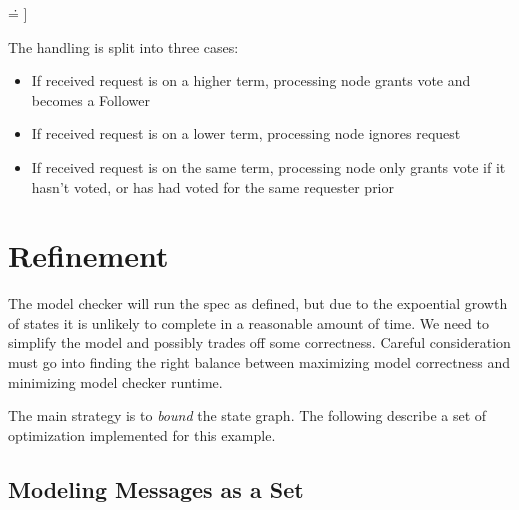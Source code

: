\begin{tlatex}
{ \.{=} ]}%
 \@x{\@s{36.89} \.{\land} messages \.{'} \.{=} AddMessage ( [ fSrc \.{\mapsto}
 i ,\,}%
%
%
%
\@x{\@s{40.99} fSuccess \.{\mapsto} 1 ] ,\,}%
%
\end{tlatex}
\newline

The handling is split into three cases: 
\begin{itemize}
    \item If received request is on a higher term, processing node grants vote and becomes a Follower
    \item If received request is on a lower term, processing node ignores request
    \item If received request is on the same term, processing node only grants
    vote if it hasn't voted, or has had voted for the same requester prior 
\end{itemize}

\section{Refinement}

The model checker will run the spec as defined, but due to the expoential growth
of states it is unlikely to complete in a reasonable amount of time. We need to
simplify the model and possibly trades off some correctness. Careful
consideration must go into finding the right balance between maximizing model
correctness and minimizing model checker runtime.\newline

The main strategy is to \textit{bound} the state graph. The following describe a
set of optimization implemented for this example.

\subsection{Modeling Messages as a Set}

